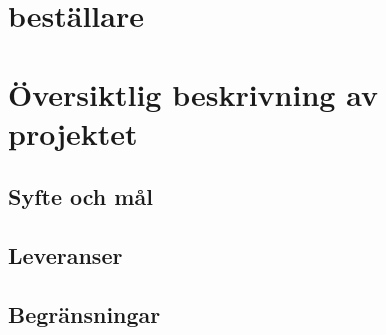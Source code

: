 \documentclass[projektplan/plan.tex]{subfiles}
\begin{document}
\section{beställare}

\section{Översiktlig beskrivning av projektet}
\subsection{Syfte och mål}
\subsection{Leveranser}
\subsection{Begränsningar}
\end{document}
